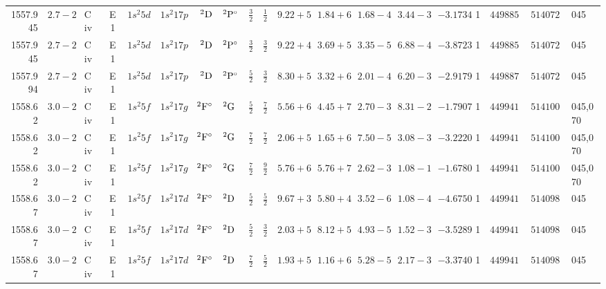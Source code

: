 \begin{table*}
\begin{tabular}{rrlcr@{ -- }lr@{ -- }lr@{ -- }lllllrrr@{ -- }rl}
   1557.945\phantom{0000000} & $2.7-2$ & C\,{\sc iv} & E1 &  $1s^{2}5d$ & $1s^{2}17p$ &       $^{2}{\rm D}$ & $^{2}{\rm P}^\circ$ &  $\frac{3}{2}$ & $\frac{1}{2}$  & $9.22+5$ & $1.84+6$ & $1.68-4$ & $3.44-3$ & $ -3.1734$ &     1 & $449885.50$ & $514072.60$ & 045 \\
   1557.945\phantom{0000000} & $2.7-2$ & C\,{\sc iv} & E1 &  $1s^{2}5d$ & $1s^{2}17p$ &       $^{2}{\rm D}$ & $^{2}{\rm P}^\circ$ &  $\frac{3}{2}$ & $\frac{3}{2}$  & $9.22+4$ & $3.69+5$ & $3.35-5$ & $6.88-4$ & $ -3.8723$ &     1 & $449885.50$ & $514072.60$ & 045 \\
   1557.994\phantom{0000000} & $2.7-2$ & C\,{\sc iv} & E1 &  $1s^{2}5d$ & $1s^{2}17p$ &       $^{2}{\rm D}$ & $^{2}{\rm P}^\circ$ &  $\frac{5}{2}$ & $\frac{3}{2}$  & $8.30+5$ & $3.32+6$ & $2.01-4$ & $6.20-3$ & $ -2.9179$ &     1 & $449887.50$ & $514072.60$ & 045 \\
   1558.62\phantom{00000000} & $3.0-2$ & C\,{\sc iv} & E1 &  $1s^{2}5f$ & $1s^{2}17g$ & $^{2}{\rm F}^\circ$ & $^{2}{\rm G}$       &  $\frac{5}{2}$ & $\frac{7}{2}$  & $5.56+6$ & $4.45+7$ & $2.70-3$ & $8.31-2$ & $ -1.7907$ &     1 & $449941.30$ & $514100.70$ & 045,070 \\
   1558.62\phantom{00000000} & $3.0-2$ & C\,{\sc iv} & E1 &  $1s^{2}5f$ & $1s^{2}17g$ & $^{2}{\rm F}^\circ$ & $^{2}{\rm G}$       &  $\frac{7}{2}$ & $\frac{7}{2}$  & $2.06+5$ & $1.65+6$ & $7.50-5$ & $3.08-3$ & $ -3.2220$ &     1 & $449941.30$ & $514100.70$ & 045,070 \\
   1558.62\phantom{00000000} & $3.0-2$ & C\,{\sc iv} & E1 &  $1s^{2}5f$ & $1s^{2}17g$ & $^{2}{\rm F}^\circ$ & $^{2}{\rm G}$       &  $\frac{7}{2}$ & $\frac{9}{2}$  & $5.76+6$ & $5.76+7$ & $2.62-3$ & $1.08-1$ & $ -1.6780$ &     1 & $449941.30$ & $514100.70$ & 045,070 \\
   1558.67\phantom{00000000} & $3.0-2$ & C\,{\sc iv} & E1 &  $1s^{2}5f$ & $1s^{2}17d$ & $^{2}{\rm F}^\circ$ & $^{2}{\rm D}$       &  $\frac{5}{2}$ & $\frac{5}{2}$  & $9.67+3$ & $5.80+4$ & $3.52-6$ & $1.08-4$ & $ -4.6750$ &     1 & $449941.30$ & $514098.50$ & 045 \\
   1558.67\phantom{00000000} & $3.0-2$ & C\,{\sc iv} & E1 &  $1s^{2}5f$ & $1s^{2}17d$ & $^{2}{\rm F}^\circ$ & $^{2}{\rm D}$       &  $\frac{5}{2}$ & $\frac{3}{2}$  & $2.03+5$ & $8.12+5$ & $4.93-5$ & $1.52-3$ & $ -3.5289$ &     1 & $449941.30$ & $514098.50$ & 045 \\
   1558.67\phantom{00000000} & $3.0-2$ & C\,{\sc iv} & E1 &  $1s^{2}5f$ & $1s^{2}17d$ & $^{2}{\rm F}^\circ$ & $^{2}{\rm D}$       &  $\frac{7}{2}$ & $\frac{5}{2}$  & $1.93+5$ & $1.16+6$ & $5.28-5$ & $2.17-3$ & $ -3.3740$ &     1 & $449941.30$ & $514098.50$ & 045 \\

\end{tabular}
\end{table*}
